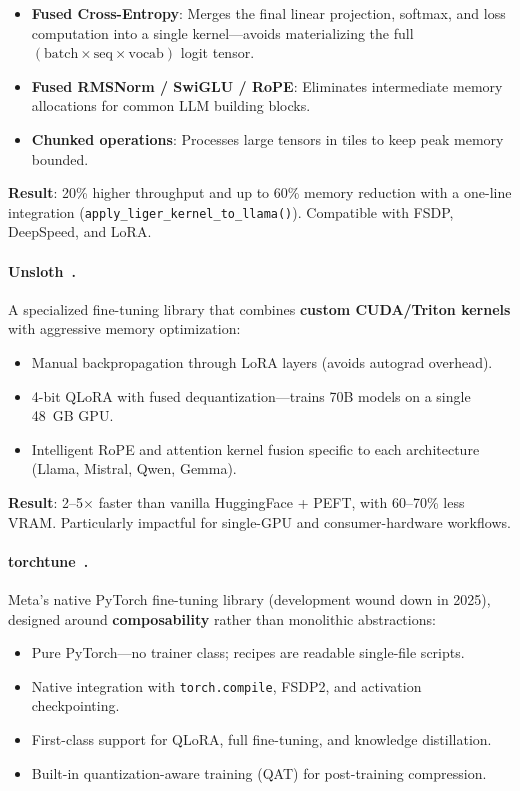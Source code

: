 \begin{itemize}
  \item \textbf{Fused Cross-Entropy}: Merges the final linear projection, softmax, and loss computation into a single kernel---avoids materializing the full $(\text{batch} \times \text{seq} \times \text{vocab})$ logit tensor.
  \item \textbf{Fused RMSNorm / SwiGLU / RoPE}: Eliminates intermediate memory allocations for common LLM building blocks.
  \item \textbf{Chunked operations}: Processes large tensors in tiles to keep peak memory bounded.
\end{itemize}

\textbf{Result}: 20\% higher throughput and up to 60\% memory reduction with a one-line integration (\texttt{apply\_liger\_kernel\_to\_llama()}). Compatible with FSDP, DeepSpeed, and LoRA.

\paragraph{Unsloth~\cite{unsloth2024}.}
\label{unsloth-.}

A specialized fine-tuning library that combines \textbf{custom CUDA/Triton kernels} with aggressive memory optimization:

\begin{itemize}
  \item Manual backpropagation through LoRA layers (avoids autograd overhead).
  \item 4-bit QLoRA with fused dequantization---trains 70B models on a single 48~GB GPU.
  \item Intelligent RoPE and attention kernel fusion specific to each architecture (Llama, Mistral, Qwen, Gemma).
\end{itemize}

\textbf{Result}: 2--5$\times$ faster than vanilla HuggingFace + PEFT, with 60--70\% less VRAM. Particularly impactful for single-GPU and consumer-hardware workflows.

\paragraph{torchtune~\cite{torchtune2024}.}
\label{torchtune-.}

Meta’s native PyTorch fine-tuning library (development wound down in 2025), designed around \textbf{composability} rather than monolithic abstractions:

\begin{itemize}
  \item Pure PyTorch---no trainer class; recipes are readable single-file scripts.
  \item Native integration with \texttt{torch.compile}, FSDP2, and activation checkpointing.
  \item First-class support for QLoRA, full fine-tuning, and knowledge distillation.
  \item Built-in quantization-aware training (QAT) for post-training compression.
\end{itemize}

